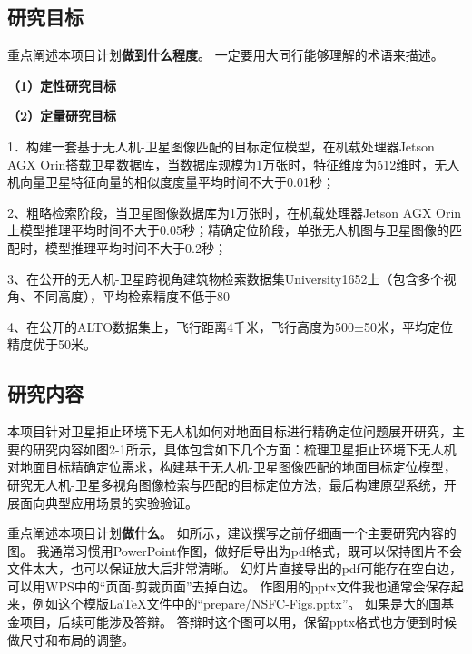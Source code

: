 \documentclass[12pt]{article}
\newcommand{\myEmph}[1]{\textbf{\textcolor[rgb]{0,0,0.25}{#1}}}
\begin{document}
{


}



\subsection{研究目标}


重点阐述本项目计划\myEmph{做到什么程度}。
一定要用大同行能够理解的术语来描述。

\myEmph{（1）定性研究目标}


\myEmph{（2）定量研究目标}

1．构建一套基于无人机-卫星图像匹配的目标定位模型，在机载处理器Jetson AGX Orin搭载卫星数据库，当数据库规模为1万张时，特征维度为512维时，无人机向量卫星特征向量的相似度度量平均时间不大于0.01秒；

2、粗略检索阶段，当卫星图像数据库为1万张时，在机载处理器Jetson AGX Orin上模型推理平均时间不大于0.05秒；精确定位阶段，单张无人机图与卫星图像的匹配时，模型推理平均时间不大于0.2秒；

3、在公开的无人机-卫星跨视角建筑物检索数据集University1652上（包含多个视角、不同高度），平均检索精度不低于80%

4、在公开的ALTO数据集上，飞行距离4千米，飞行高度为500±50米，平均定位精度优于50米。


\subsection{研究内容}

本项目针对卫星拒止环境下无人机如何对地面目标进行精确定位问题展开研究，主要的研究内容如图2-1所示，具体包含如下几个方面：梳理卫星拒止环境下无人机对地面目标精确定位需求，构建基于无人机-卫星图像匹配的地面目标定位模型，研究无人机-卫星多视角图像检索与匹配的目标定位方法，最后构建原型系统，开展面向典型应用场景的实验验证。


重点阐述本项目计划\myEmph{做什么}。
如所示，建议撰写之前仔细画一个主要研究内容的图。
我通常习惯用PowerPoint作图，做好后导出为pdf格式，既可以保持图片不会文件太大，也可以保证放大后非常清晰。
幻灯片直接导出的pdf可能存在空白边，可以用WPS中的“页面-剪裁页面”去掉白边。
作图用的pptx文件我也通常会保存起来，例如这个模版\LaTeX 文件中的“prepare/NSFC-Figs.pptx”。
如果是大的国基金项目，后续可能涉及答辩。
答辩时这个图可以用，保留pptx格式也方便到时候做尺寸和布局的调整。
\end{document}
